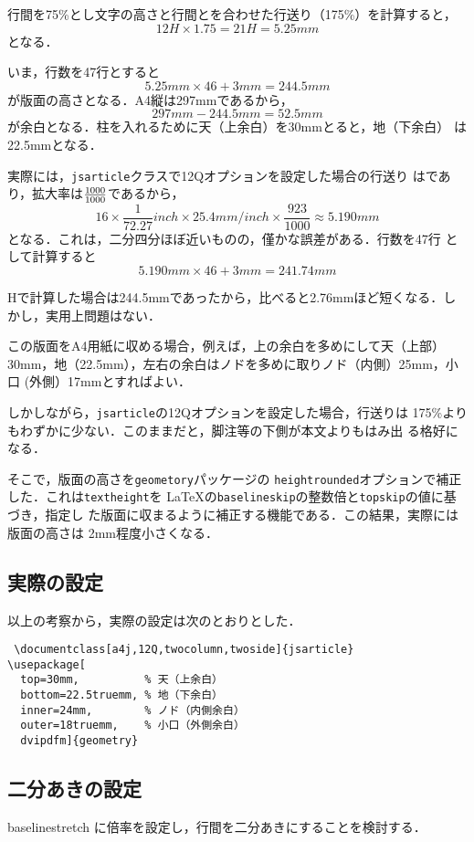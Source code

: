 \documentclass[a4j, 12Q, twocolumn, twoside]{jsarticle}
\newcommand{\cmd}[1]{\texttt{\symbol{"5C}#1}} %
\begin{document}
  行間を75\%とし文字の高さと行間とを合わせた行送り（175\%）を計算すると，
  \[
   12H \times 1.75 = 21H = 5.25 mm
  \]
  となる．

  いま，行数を47行とすると
  \[
   5.25 mm \times 46 + 3mm = 244.5mm
  \]
  が版面の高さとなる．A4縦は297mmであるから，
  \[
   297mm - 244.5mm = 52.5mm
  \]
  が余白となる．柱を入れるために天（上余白）を30mmとると，地（下余白）
  は22.5mmとなる．

  実際には，\texttt{jsarticle}クラスで12Qオプションを設定した場合の行送り
  は\the\baselineskip であり，拡大率は$\frac{\the\mag}{1000}$であるから，
  \[
    16 \times \frac{1}{72.27} inch \times 25.4 mm/inch \times
    \frac{923}{1000} \approx 5.190 mm
  \]
  となる．これは，二分四分ほぼ近いものの，僅かな誤差がある．行数を47行
  として計算すると
  \[
   5.190 mm \times 46 + 3mm = 241.74mm
  \]

  Hで計算した場合は244.5mmであったから，比べると2.76mmほど短くなる．し
  かし，実用上問題はない．

この版面をA4用紙に収める場合，例えば，上の余白を多めにして天（上部）
30mm，地（22.5mm），左右の余白はノドを多めに取りノド（内側）25mm，小口
(外側）17mmとすればよい．

しかしながら，\texttt{jsarticle}の12Qオプションを設定した場合，行送りは
175\%よりもわずかに少ない．このままだと，脚注等の下側が本文よりもはみ出
る格好になる．

そこで，版面の高さを\texttt{geometory}パッケージの
\texttt{heightrounded}オプションで補正した．これは\cmd{textheight}を
\LaTeX の\cmd{baselineskip}の整数倍と\cmd{topskip}の値に基づき，指定し
た版面に収まるように補正する機能である．この結果，実際には版面の高さは
2mm程度小さくなる．

  
\subsection{実際の設定}

  以上の考察から，実際の設定は次のとおりとした．

{\small \begin{verbatim} \documentclass[a4j,12Q,twocolumn,twoside]{jsarticle}
\usepackage[
  top=30mm,          % 天（上余白）
  bottom=22.5truemm, % 地（下余白）
  inner=24mm,        % ノド（内側余白）
  outer=18truemm,    % 小口（外側余白）
  dvipdfm]{geometry}
\end{verbatim}
}

\subsection{二分あきの設定}
  baselinestretch に倍率を設定し，行間を二分あきにすることを検討する．
  
\end{document}
